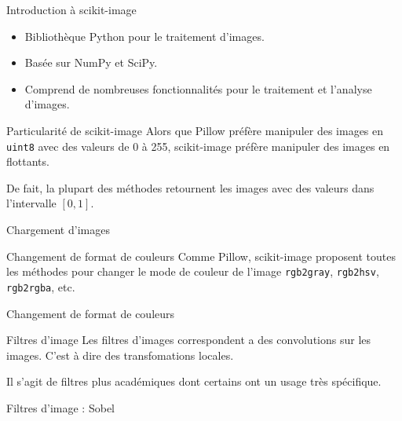 \begin{frame}{Introduction à scikit-image}
  \begin{itemize}
    \item Bibliothèque Python pour le traitement d'images.
    \item Basée sur NumPy et SciPy.
    \item Comprend de nombreuses fonctionnalités pour le traitement et l'analyse
          d'images.
  \end{itemize}
\end{frame}

\begin{frame}{Particularité de scikit-image}
  Alors que \alert{Pillow} préfère manipuler des images en \texttt{uint8} avec des valeurs de 0 à 255, \alert{scikit-image} préfère manipuler des images en flottants.

  De fait, la plupart des méthodes retournent les images avec des valeurs dans
  l'intervalle $[0,1]$.
\end{frame}

\begin{frame}{Chargement d'images}
\end{frame}

\begin{frame}{Changement de format de couleurs}
  Comme Pillow, scikit-image proposent toutes les méthodes pour changer le mode de couleur de l'image \texttt{rgb2gray}, \texttt{rgb2hsv}, \texttt{rgb2rgba}, etc.
\end{frame}

\begin{frame}{Changement de format de couleurs}
\end{frame}

\begin{frame}{Filtres d'image}
  Les filtres d'images correspondent a des convolutions sur les images. C'est à dire des transfomations locales.
  
  Il s'agit de filtres plus académiques dont certains ont un usage très spécifique.
\end{frame}

\begin{frame}{Filtres d'image : Sobel}
\end{frame}

